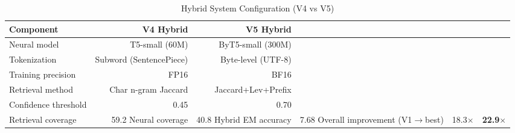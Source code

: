 \begin{table}[htbp]
\centering
\caption{Hybrid System Configuration (V4 vs V5)}
\label{tab:hybrid}
\begin{tabular}{lrr}
\toprule
\textbf{Component} & \textbf{V4 Hybrid} & \textbf{V5 Hybrid} \\
\midrule
Neural model & T5-small (60M) & ByT5-small (300M) \\
Tokenization & Subword (SentencePiece) & Byte-level (UTF-8) \\
Training precision & FP16 & BF16 \\
Retrieval method & Char n-gram Jaccard & Jaccard+Lev+Prefix \\
Confidence threshold & 0.45 & 0.70 \\
Retrieval coverage & 59.2%
Neural coverage & 40.8%
Hybrid EM accuracy & 7.68%
Overall improvement (V1$\rightarrow$best) & 18.3$\times$ & \textbf{22.9$\times$} \\
\bottomrule
\end{tabular}
\end{table}
